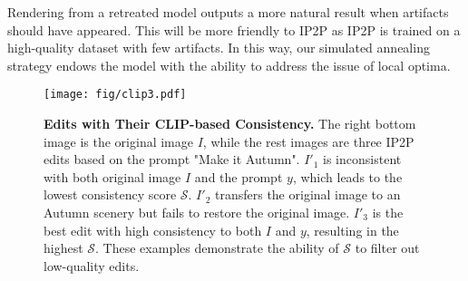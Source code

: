 Rendering from a retreated model outputs a more natural result when artifacts should have appeared. This will be more friendly to IP2P as IP2P is trained on a high-quality dataset with few artifacts. In this way, our simulated annealing strategy endows the model with the ability to address the issue of local optima.

\begin{figure}[t]
    \centering
    \texttt{[image: fig/clip3.pdf]}
    \caption{\textbf{Edits with Their CLIP-based Consistency.} The right bottom image is the original image $I$, while the rest images are three IP2P edits based on the prompt "Make it Autumn". $I'_1$ is inconsistent with both original image $I$ and the prompt $y$, which leads to the lowest consistency score $\mathcal{S}$. $I'_2$ transfers the original image to an Autumn scenery but fails to restore the original image. $I'_3$ is the best edit with high consistency to both $I$ and $y$, resulting in the highest $\mathcal{S}$. These examples demonstrate the ability of $\mathcal{S}$ to filter out low-quality edits.}
    \label{fig: clip consistency}
\end{figure}

